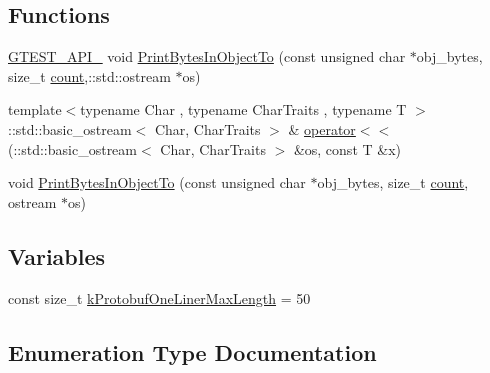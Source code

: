 \subsection*{Functions}
\begin{DoxyCompactItemize}
\item 
\hyperlink{gtest-port_8h_aa73be6f0ba4a7456180a94904ce17790}{G\+T\+E\+S\+T\+\_\+\+A\+P\+I\+\_\+} void \hyperlink{namespacetesting_1_1internal2_a04a384ee5de3a9f4f00a6052ea79b495}{Print\+Bytes\+In\+Object\+To} (const unsigned char $\ast$obj\+\_\+bytes, size\+\_\+t \hyperlink{gmock__stress__test_8cc_afd9db40e3361ae09188795e8cbe19752}{count},\+::std\+::ostream $\ast$os)
\item 
{\footnotesize template$<$typename Char , typename Char\+Traits , typename T $>$ }\\\+::std\+::basic\+\_\+ostream$<$ Char, Char\+Traits $>$ \& \hyperlink{namespacetesting_1_1internal2_a07dbe129beb8952074f04b599dfce39b}{operator$<$$<$} (\+::std\+::basic\+\_\+ostream$<$ Char, Char\+Traits $>$ \&os, const T \&x)
\item 
void \hyperlink{namespacetesting_1_1internal2_abfb9aa80365f93b952e9a4bea09947a8}{Print\+Bytes\+In\+Object\+To} (const unsigned char $\ast$obj\+\_\+bytes, size\+\_\+t \hyperlink{gmock__stress__test_8cc_afd9db40e3361ae09188795e8cbe19752}{count}, ostream $\ast$os)
\end{DoxyCompactItemize}
\subsection*{Variables}
\begin{DoxyCompactItemize}
\item 
const size\+\_\+t \hyperlink{namespacetesting_1_1internal2_a140c8efd51e63a3def98445bff107518}{k\+Protobuf\+One\+Liner\+Max\+Length} = 50
\end{DoxyCompactItemize}


\subsection{Enumeration Type Documentation}
